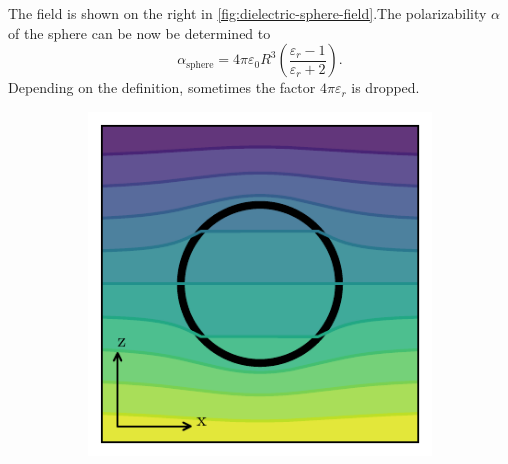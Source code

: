 The field is shown on the right in \cref{fig:dielectric-sphere-field}.The polarizability $\alpha$ of the sphere can be now be determined to
\begin{equation}
  \alpha_\mathrm{sphere} = 4\pi \varepsilon_0 R^3 \left(\frac{\varepsilon_r - 1}{\varepsilon_r + 2}\right).
\end{equation}
Depending on the definition, sometimes the factor $4\pi\varepsilon_r$ is dropped.
\begin{figure}[!htbp]
  \centering
  \begin{subfigure}[b]{0.48\textwidth}
      \centering
      \includegraphics[width=\textwidth]{./../figures/potential-dielectric-sphere-small.pdf}
  \end{subfigure}
  \hfill
  \begin{subfigure}[b]{0.48\textwidth}
      \centering

\end{subfigure}
\end{figure}
